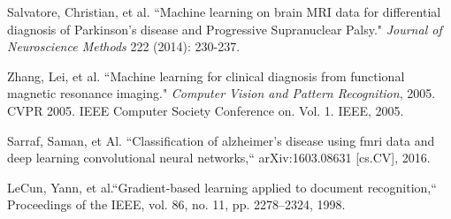 \documentclass{article}[12pt]
\begin{document}
   \newpage
   \begin{thebibliography}{9}
   	
   	Salvatore, Christian, et al. ``Machine learning on brain MRI data for differential diagnosis of Parkinson's disease and Progressive Supranuclear Palsy." \textit{Journal of Neuroscience Methods} 222 (2014): 230-237.
   	
   	Zhang, Lei, et al. ``Machine learning for clinical diagnosis from functional magnetic resonance imaging." \textit{Computer Vision and Pattern Recognition}, 2005. CVPR 2005. IEEE Computer Society Conference on. Vol. 1. IEEE, 2005.
   
   Sarraf, Saman, et Al. ``Classification  of alzheimer’s disease using fmri data and deep learning convolutional neural networks,`` arXiv:1603.08631 [cs.CV], 2016.
   	
   	LeCun, Yann, et al.``Gradient-based learning applied to document recognition,`` Proceedings of the IEEE, vol. 86, no. 11, pp. 2278–2324, 1998. 
   	\end{thebibliography}
   
   
   
   
   
\end{document}
